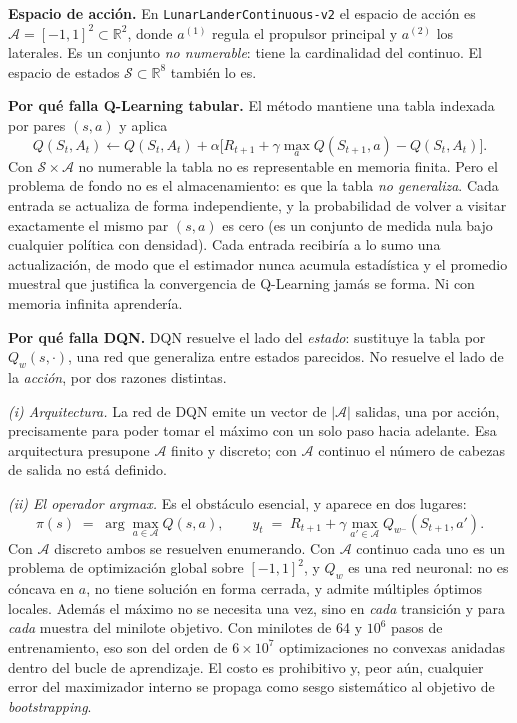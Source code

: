 \documentclass[11pt,letterpaper]{article}
\newcommand{\lead}[1]{\textbf{#1}}
\begin{document}
\begin{respuesta}
\lead{Espacio de acción.} En \texttt{LunarLanderContinuous-v2} el espacio de acción es
$\mathcal{A} = [-1,1]^2 \subset \mathbb{R}^2$, donde $a^{(1)}$ regula el propulsor
principal y $a^{(2)}$ los laterales. Es un conjunto \emph{no numerable}: tiene la
cardinalidad del continuo. El espacio de estados $\mathcal{S} \subset \mathbb{R}^8$
también lo es.

\medskip
\lead{Por qué falla Q-Learning tabular.} El método mantiene una tabla indexada por pares
$(s,a)$ y aplica
\[
  Q(S_t,A_t) \leftarrow Q(S_t,A_t) + \alpha\Big[R_{t+1} + \gamma \max_{a}Q(S_{t+1},a) - Q(S_t,A_t)\Big].
\]
Con $\mathcal{S}\times\mathcal{A}$ no numerable la tabla no es representable en memoria
finita. Pero el problema de fondo no es el almacenamiento: es que la tabla \emph{no
generaliza}. Cada entrada se actualiza de forma independiente, y la probabilidad de
volver a visitar exactamente el mismo par $(s,a)$ es cero (es un conjunto de medida nula
bajo cualquier política con densidad). Cada entrada recibiría a lo sumo una
actualización, de modo que el estimador nunca acumula estadística y el promedio muestral
que justifica la convergencia de Q-Learning jamás se forma. Ni con memoria infinita
aprendería.

\medskip
\lead{Por qué falla DQN.} DQN resuelve el lado del \emph{estado}: sustituye la tabla por
$Q_w(s,\cdot)$, una red que generaliza entre estados parecidos. No resuelve el lado de la
\emph{acción}, por dos razones distintas.

\emph{(i) Arquitectura.} La red de DQN emite un vector de $|\mathcal{A}|$ salidas, una
por acción, precisamente para poder tomar el máximo con un solo paso hacia adelante. Esa
arquitectura presupone $\mathcal{A}$ finito y discreto; con $\mathcal{A}$ continuo el
número de cabezas de salida no está definido.

\emph{(ii) El operador \textit{argmax}.} Es el obstáculo esencial, y aparece en dos
lugares:
\[
  \pi(s) \;=\; \arg\max_{a \in \mathcal{A}} Q(s,a),
  \qquad
  y_t \;=\; R_{t+1} + \gamma \max_{a' \in \mathcal{A}} Q_{w^-}(S_{t+1}, a').
\]
Con $\mathcal{A}$ discreto ambos se resuelven enumerando. Con $\mathcal{A}$ continuo cada
uno es un problema de optimización global sobre $[-1,1]^2$, y $Q_w$ es una red neuronal:
no es cóncava en $a$, no tiene solución en forma cerrada, y admite múltiples óptimos
locales. Además el máximo no se necesita una vez, sino en \emph{cada} transición y para
\emph{cada} muestra del minilote objetivo. Con minilotes de 64 y $10^6$ pasos de
entrenamiento, eso son del orden de $6\times 10^7$ optimizaciones no convexas anidadas
dentro del bucle de aprendizaje. El costo es prohibitivo y, peor aún, cualquier error del
maximizador interno se propaga como sesgo sistemático al objetivo de \textit{bootstrapping}.


\end{respuesta}
\end{document}
